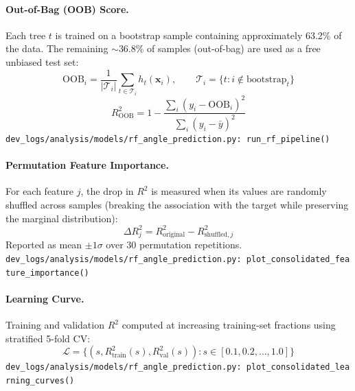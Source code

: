 \paragraph{Out-of-Bag (OOB) Score.}
Each tree $t$ is trained on a bootstrap sample containing approximately 63.2\% of the data. The remaining $\sim$36.8\% of samples (out-of-bag) are used as a free unbiased test set:
\begin{equation}
    \mathrm{OOB}_i = \frac{1}{|\mathcal{T}_i|}\sum_{t \in \mathcal{T}_i} h_t(\mathbf{x}_i),\qquad \mathcal{T}_i = \{t : i \notin \text{bootstrap}_t\}
\end{equation}
\begin{equation}
    R^2_{\text{OOB}} = 1 - \frac{\sum_{i} (y_i - \mathrm{OOB}_i)^2}{\sum_i (y_i - \bar{y})^2}
\end{equation}
\texttt{\small dev\_logs/analysis/models/rf\_angle\_prediction.py:\ run\_rf\_pipeline()}

\medskip
\paragraph{Permutation Feature Importance.}
For each feature $j$, the drop in $R^2$ is measured when its values are randomly shuffled across samples (breaking the association with the target while preserving the marginal distribution):
\begin{equation}
    \Delta R^2_j = R^2_{\text{original}} - R^2_{\text{shuffled},j}
\end{equation}
Reported as mean $\pm 1\sigma$ over 30 permutation repetitions.\\
\texttt{\small dev\_logs/analysis/models/rf\_angle\_prediction.py:\ plot\_consolidated\_feature\_importance()}

\medskip
\paragraph{Learning Curve.}
Training and validation $R^2$ computed at increasing training-set fractions using stratified 5-fold CV:
\begin{equation}
    \mathcal{L} = \{(s, R^2_{\text{train}}(s), R^2_{\text{val}}(s)) : s \in [0.1, 0.2, \ldots, 1.0]\}
\end{equation}
\texttt{\small dev\_logs/analysis/models/rf\_angle\_prediction.py:\ plot\_consolidated\_learning\_curves()}

\medskip
